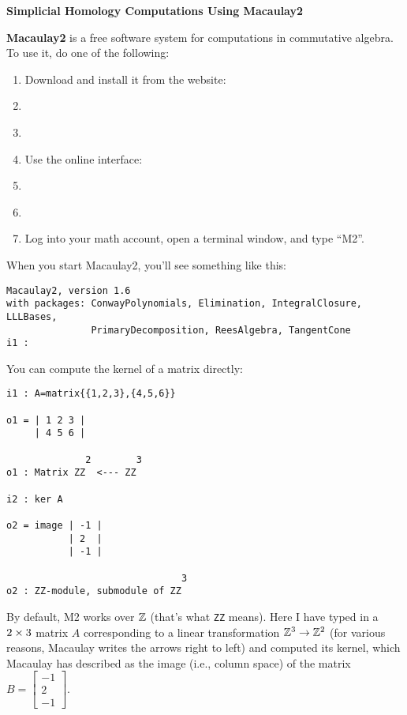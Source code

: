 

\thispagestyle{empty}
\begin{center}
{\bf\LARGE Simplicial Homology Computations Using Macaulay2}
\end{center}
\bigskip

{\bf Macaulay2} is a free software system for computations in commutative algebra.  To use it, do one of the following:
\begin{enumerate}
\item Download and install it from the website:
\item[] \href{http://www.math.uiuc.edu/Macaulay2}{}
\item[]
\item Use the online interface:
\item[] \href{http://habanero.math.cornell.edu:3690}{}
\item[]
\item Log into your math account, open a terminal window, and type ``M2''.
\end{enumerate}
\bigskip

When you start Macaulay2, you'll see something like this:
\begin{framed}
\begin{verbatim}
Macaulay2, version 1.6
with packages: ConwayPolynomials, Elimination, IntegralClosure, LLLBases,
               PrimaryDecomposition, ReesAlgebra, TangentCone
i1 : 
\end{verbatim}
\end{framed}

You can compute the kernel of a matrix directly:
\begin{framed}
\begin{verbatim}
i1 : A=matrix{{1,2,3},{4,5,6}}

o1 = | 1 2 3 |
     | 4 5 6 |

              2        3
o1 : Matrix ZZ  <--- ZZ

i2 : ker A

o2 = image | -1 |
           | 2  |
           | -1 |

                               3
o2 : ZZ-module, submodule of ZZ
\end{verbatim}
\end{framed}

By default, M2 works over $\mathbb{Z}$ (that's what \texttt{ZZ} means).
Here I have typed in a $2\times3$ matrix $A$ corresponding
to a linear transformation $\mathbb{Z}^3\to\mathbb{Z}^2$ (for various reasons,
Macaulay writes the arrows right to left) and computed
its kernel, which Macaulay has described as the image (i.e.,
column space) of the matrix $B=\begin{bmatrix}-1\\2\\-1\end{bmatrix}$.

